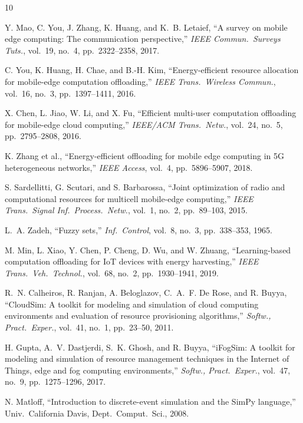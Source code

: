 \documentclass[conference]{IEEEtran}
\begin{document}
\begin{thebibliography}{10}

Y. Mao, C. You, J. Zhang, K. Huang, and K.~B. Letaief,
``A survey on mobile edge computing: The communication perspective,''
\textit{IEEE Commun.\ Surveys Tuts.}, vol.~19, no.~4,
pp.~2322--2358, 2017.

C. You, K. Huang, H. Chae, and B.-H. Kim,
``Energy-efficient resource allocation for mobile-edge computation offloading,''
\textit{IEEE Trans.\ Wireless Commun.}, vol.~16, no.~3,
pp.~1397--1411, 2016.

X. Chen, L. Jiao, W. Li, and X. Fu,
``Efficient multi-user computation offloading for mobile-edge cloud computing,''
\textit{IEEE/ACM Trans.\ Netw.}, vol.~24, no.~5,
pp.~2795--2808, 2016.

K. Zhang et al.,
``Energy-efficient offloading for mobile edge computing in 5G heterogeneous networks,''
\textit{IEEE Access}, vol.~4, pp.~5896--5907, 2018.

S. Sardellitti, G. Scutari, and S. Barbarossa,
``Joint optimization of radio and computational resources for multicell mobile-edge computing,''
\textit{IEEE Trans.\ Signal Inf.\ Process.\ Netw.},
vol.~1, no.~2, pp.~89--103, 2015.

L.~A. Zadeh,
``Fuzzy sets,''
\textit{Inf.\ Control}, vol.~8, no.~3, pp.~338--353, 1965.

M. Min, L. Xiao, Y. Chen, P. Cheng, D. Wu, and W. Zhuang,
``Learning-based computation offloading for IoT devices with energy harvesting,''
\textit{IEEE Trans.\ Veh.\ Technol.}, vol.~68, no.~2,
pp.~1930--1941, 2019.

R.~N. Calheiros, R. Ranjan, A. Beloglazov, C.~A.~F. De Rose, and R. Buyya,
``CloudSim: A toolkit for modeling and simulation of cloud computing environments and evaluation of resource provisioning algorithms,''
\textit{Softw., Pract.\ Exper.}, vol.~41, no.~1,
pp.~23--50, 2011.

H. Gupta, A.~V. Dastjerdi, S.~K. Ghosh, and R. Buyya,
``iFogSim: A toolkit for modeling and simulation of resource management techniques in the Internet of Things, edge and fog computing environments,''
\textit{Softw., Pract.\ Exper.}, vol.~47, no.~9,
pp.~1275--1296, 2017.

N. Matloff,
``Introduction to discrete-event simulation and the SimPy language,''
Univ.\ California Davis, Dept.\ Comput.\ Sci., 2008.

\end{thebibliography}
\end{document}
